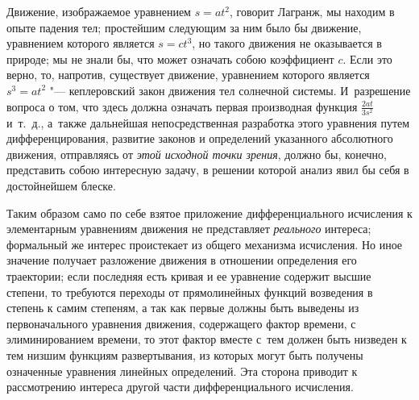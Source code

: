 Движение, изображаемое уравнением $s=at^2$, говорит Лагранж, мы находим в опыте
падения тел; простейшим следующим за ним было бы движение, уравнением которого
является $s=ct^3$, но такого движения не оказывается в природе; мы не знали бы,
что может означать собою коэффициент $c$. Если это верно, то, напротив,
существует движение, уравнением которого является $s^3=at^2$ "--- кеплеровский
закон движения тел солнечной системы. И~разрешение вопроса о том, что здесь
должна означать первая производная функция $\frac{2at}{3s^2}$ и~т.~д., а~также
дальнейшая непосредственная разработка этого уравнения путем дифференцирования,
развитие законов и определений указанного абсолютного движения, отправляясь от
{\em этой исходной точки зрения}, должно бы, конечно, представить собою
интересную задачу, в решении которой анализ явил бы себя в достойнейшем блеске.

Таким образом само по себе взятое приложение дифференциального исчисления
к элементарным уравнениям движения не представляет {\em реального} интереса;
формальный же интерес проистекает из общего механизма исчисления. Но иное
значение получает разложение движения в отношении определения его траектории;
если последняя есть кривая и ее уравнение содержит высшие степени, то требуются
переходы от прямолинейных функций возведения в степень к самим степеням, а так
как первые должны быть выведены из первоначального уравнения движения,
содержащего фактор времени, с элиминированием времени, то этот фактор вместе
с~тем должен быть низведен к тем низшим функциям развертывания, из которых
могут быть получены означенные уравнения линейных определений. Эта сторона
приводит к рассмотрению интереса другой части дифференциального исчисления.

